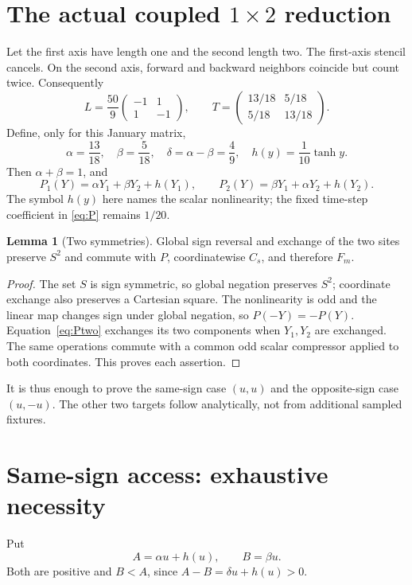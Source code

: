 \documentclass[11pt,a4paper]{article}
\theoremstyle{definition}
\newtheorem{lemma}[theorem]{Lemma}
\theoremstyle{remark}\newtheorem{remark}[theorem]{Remark}
\numberwithin{equation}{section}
\begin{document}
\section{The actual coupled $1\times2$ reduction}\label{sec:twosite}
Let the first axis have length one and the second length two.
The first-axis stencil cancels. On the second axis, forward and backward neighbors
coincide but count twice. Consequently
\begin{equation}\label{eq:Ttwo}
 L=\frac{50}{9}
 \begin{pmatrix}-1&1\\1&-1\end{pmatrix},
 \qquad
 T=\begin{pmatrix}13/18&5/18\\5/18&13/18\end{pmatrix}.
\end{equation}
Define, only for this January matrix,
\begin{equation}\label{eq:alphabeta}
 \alpha=\frac{13}{18},\quad\beta=\frac5{18},\quad
 \delta=\alpha-\beta=\frac49,\quad h(y)=\frac1{10}\tanh y.
\end{equation}
Then $\alpha+\beta=1$, and
\begin{equation}\label{eq:Ptwo}
 P_1(Y)=\alpha Y_1+\beta Y_2+h(Y_1),\qquad
 P_2(Y)=\beta Y_1+\alpha Y_2+h(Y_2).
\end{equation}
The symbol $h(y)$ here names the scalar nonlinearity; the fixed time-step coefficient
in \eqref{eq:P} remains $1/20$.

\begin{lemma}[Two symmetries]\label{lem:symmetry}
Global sign reversal and exchange of the two sites preserve $S^2$ and commute
with $P$, coordinatewise $C_s$, and therefore $F_m$.
\end{lemma}
\begin{proof}
The set $S$ is sign symmetric, so global negation preserves $S^2$;
coordinate exchange also preserves a Cartesian square.
The nonlinearity is odd and the linear map changes sign under global negation,
so $P(-Y)=-P(Y)$. Equation~\eqref{eq:Ptwo} exchanges its two components when
$Y_1,Y_2$ are exchanged. The same operations commute with a common odd scalar
compressor applied to both coordinates. This proves each assertion.
\end{proof}
It is thus enough to prove the same-sign case $(u,u)$ and the opposite-sign
case $(u,-u)$. The other two targets follow analytically, not from additional
sampled fixtures.

\section{Same-sign access: exhaustive necessity}\label{sec:same}
Put
\begin{equation}\label{eq:AB}
 A=\alpha u+h(u),\qquad B=\beta u.
\end{equation}
Both are positive and $B<A$, since
$A-B=\delta u+h(u)>0$.
\end{document}
